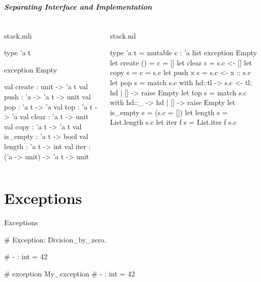 \documentclass{plt}
\begin{document}
\begin{frame}[fragile]
  \frametitle{Separating Interface and Implementation}

\begin{columns}
  \begin{column}[t]{0.5\textwidth}
stack.mli
\medskip
\begin{ocaml}
type 'a t

exception Empty

val create : unit -> 'a t
val push : 'a -> 'a t -> unit
val pop : 'a t -> 'a
val top : 'a t -> 'a
val clear : 'a t -> unit
val copy : 'a t -> 'a t
val is_empty : 'a t -> bool
val length : 'a t -> int
val iter : ('a -> unit) ->
                 'a t -> unit
\end{ocaml}
  \end{column}
  \begin{column}[t]{0.5\textwidth}
stack.ml
\medskip
\begin{ocaml}
type 'a t =
   { mutable c : 'a list }
exception Empty
let create () = { c = [] }
let clear s = s.c <- []
let copy s = { c = s.c }
let push x s = s.c <- x :: s.c
let pop s =
  match s.c with
    hd::tl -> s.c <- tl; hd
  | []     -> raise Empty
let top s =
  match s.c with
    hd::_ -> hd
  | []    -> raise Empty
let is_empty s = (s.c = [])
let length s = List.length s.c
let iter f s = List.iter f s.c
\end{ocaml}
  \end{column}
\end{columns}

\end{frame}


\part{Exceptions}

\begin{frame}[fragile]{Exceptions}

\begin{interactive}
# 
Exception: Division_by_zero.

# 
- : int = 42

# 
exception My_exception
# 
- : int = 42
\end{interactive}

\end{frame}
\end{document}
